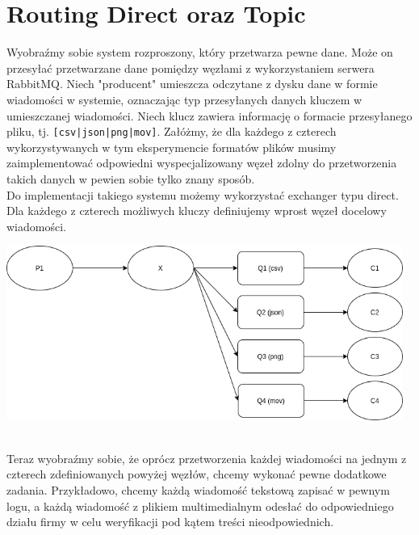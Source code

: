 \documentclass{article}
\begin{document}
    \section{Routing Direct oraz Topic}
        Wyobraźmy sobie system rozproszony, który przetwarza pewne dane. Może on przesyłać przetwarzane dane pomiędzy węzłami z wykorzystaniem serwera RabbitMQ. Niech "producent" umieszcza odczytane z dysku dane w formie wiadomości w systemie, oznaczając typ przesyłanych danych kluczem w umieszczanej wiadomości. 
        Niech klucz zawiera informację o formacie przesyłanego pliku, tj. \texttt{[csv|json|png|mov]}. 
        Załóżmy, że dla każdego z czterech wykorzystywanych w tym eksperymencie formatów plików musimy zaimplementować odpowiedni wyspecjalizowany węzeł zdolny do przetworzenia takich danych w pewien sobie tylko znany sposób.\\
        Do implementacji takiego systemu możemy wykorzystać exchanger typu direct. Dla każdego z czterech możliwych kluczy definiujemy wprost węzeł docelowy wiadomości. 
        \begin{center}
            \includegraphics[width=13cm]{lab2/report/ex3_1.png}
        \end{center}\\
        Teraz wyobraźmy sobie, że oprócz przetworzenia każdej wiadomości na jednym z czterech zdefiniowanych powyżej węzłów, chcemy wykonać pewne dodatkowe zadania. Przykładowo, chcemy każdą wiadomość tekstową zapisać w pewnym logu, a każdą wiadomość z plikiem multimedialnym odesłać do odpowiedniego działu firmy w celu weryfikacji pod kątem treści nieodpowiednich.\\
\end{document}
